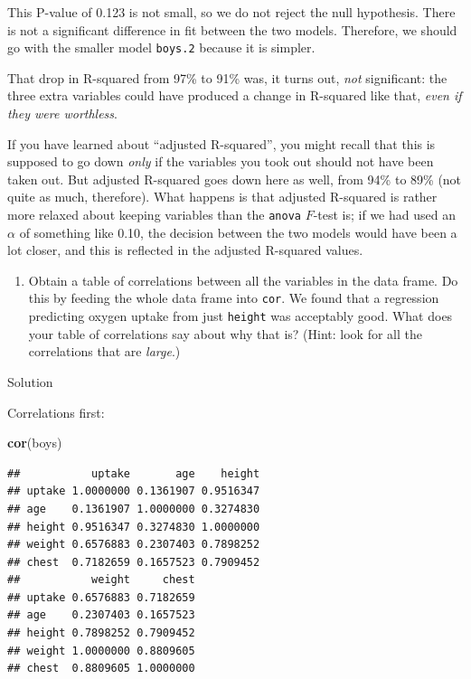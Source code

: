 \documentclass[]{tufte-book}
\newenvironment{Shaded}{}{}
\newcommand{\KeywordTok}[1]{\textcolor[rgb]{0.00,0.44,0.13}{\textbf{#1}}}
\newcommand{\NormalTok}[1]{#1}
\providecommand{\tightlist}{%
  \setlength{\itemsep}{0pt}\setlength{\parskip}{0pt}}
\theoremstyle{definition}
\theoremstyle{definition}
\theoremstyle{definition}
\theoremstyle{remark}
\begin{document}
This P-value of 0.123 is not small, so we do not reject the null
hypothesis. There is not a significant difference in fit between the two
models. Therefore, we should go with the smaller model \texttt{boys.2}
because it is simpler.

That drop in R-squared from 97\% to 91\% was, it turns out, \emph{not}
significant: the three extra variables could have produced a change in
R-squared like that, \emph{even if they were worthless}.

If you have learned about ``adjusted R-squared'', you might recall that
this is supposed to go down \emph{only} if the variables you took out
should not have been taken out. But adjusted R-squared goes down here as
well, from 94\% to 89\% (not quite as much, therefore). What happens is
that adjusted R-squared is rather more relaxed about keeping variables
than the \texttt{anova} \(F\)-test is; if we had used an \(\alpha\) of
something like 0.10, the decision between the two models would have been
a lot closer, and this is reflected in the adjusted R-squared values.

\begin{enumerate}
\def\labelenumi{(\roman{enumi})}
\tightlist
\item
  Obtain a table of correlations between all the variables in the data
  frame. Do this by feeding the whole data frame into \texttt{cor}. We
  found that a regression predicting oxygen uptake from just
  \texttt{height} was acceptably good. What does your table of
  correlations say about why that is? (Hint: look for all the
  correlations that are \emph{large}.)
\end{enumerate}

Solution

Correlations first:

\begin{Shaded}
\begin{Highlighting}[]
\KeywordTok{cor}\NormalTok{(boys)}
\end{Highlighting}
\end{Shaded}

\begin{verbatim}
##           uptake       age    height
## uptake 1.0000000 0.1361907 0.9516347
## age    0.1361907 1.0000000 0.3274830
## height 0.9516347 0.3274830 1.0000000
## weight 0.6576883 0.2307403 0.7898252
## chest  0.7182659 0.1657523 0.7909452
##           weight     chest
## uptake 0.6576883 0.7182659
## age    0.2307403 0.1657523
## height 0.7898252 0.7909452
## weight 1.0000000 0.8809605
## chest  0.8809605 1.0000000
\end{verbatim}
\end{document}
